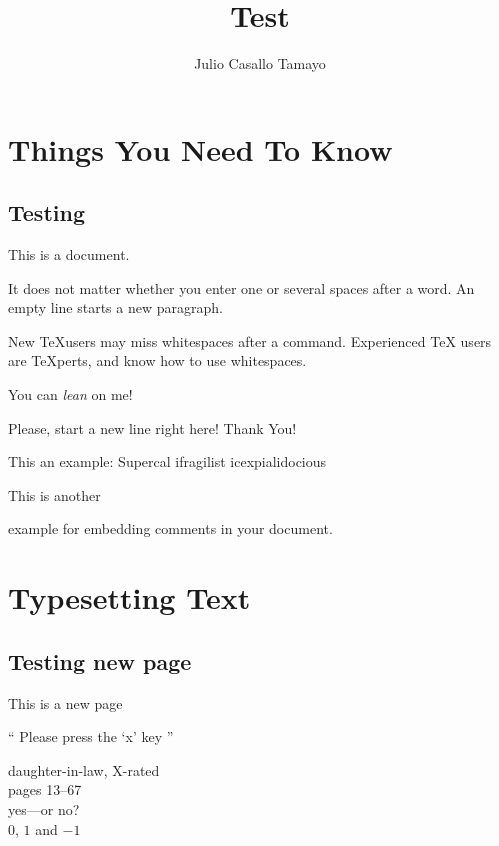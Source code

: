 \documentclass[a4paper,11pt]{book}
\title{Test}
\author{Julio Casallo Tamayo}
\begin{document}
  \maketitle

  \tableofcontents

  \chapter{Things You Need To Know}

  \section{Testing}
  This is a document.

  It does not matter whether you enter one or   several    
  spaces after a word.
  An empty line starts a new paragraph.

  New \TeX users may miss whitespaces after a command.
  Experienced \TeX{} users are \TeX perts, and know how to
  use whitespaces. %

  You can \textsl{lean} on me!

  Please, start a new line right here! \newline 
  Thank You!

  This an %
  example: Supercal%
              ifragilist%
        icexpialidocious

  This is another \begin{comment}
    rather stupid, 
    but helpful
  \end{comment}
  example for embedding comments in your document.

  

  \chapter{Typesetting Text}


  \newpage

  \section{Testing new page}
  This is a new page

  `` Please press the `x' key ''

  daughter-in-law, X-rated\\
  pages 13--67\\
  yes---or no?\\
  $0$, $1$ and $-1$
\end{document}
